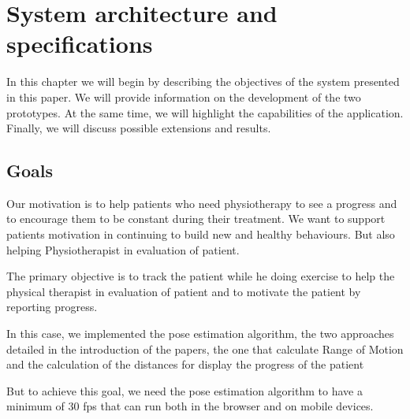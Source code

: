 
\chapter{System architecture and specifications}




In this chapter we will begin by describing the objectives of the system presented in this paper. 
We will provide information on the development of the two prototypes. 
At the same time, we will highlight the capabilities of the application. Finally, we will discuss possible extensions and results.

\section{Goals}

\par Our motivation is to help patients who need physiotherapy to see a progress and to encourage them to be 
constant during their treatment. We want to support patients motivation in continuing to build new and 
 healthy behaviours. But also helping Physiotherapist in evaluation of patient.

The primary objective is to track the patient while he doing exercise to help 
the physical therapist in evaluation of patient and to motivate the patient by reporting progress.


In this case, we implemented the pose estimation algorithm, 
the two approaches detailed in the introduction of the papers, 
the one that calculate Range of Motion  and the calculation of the distances for display the progress of the patient

But to achieve this goal, 
we need the pose estimation algorithm to have a minimum of 30 fps that can run both in the browser and on mobile devices.

